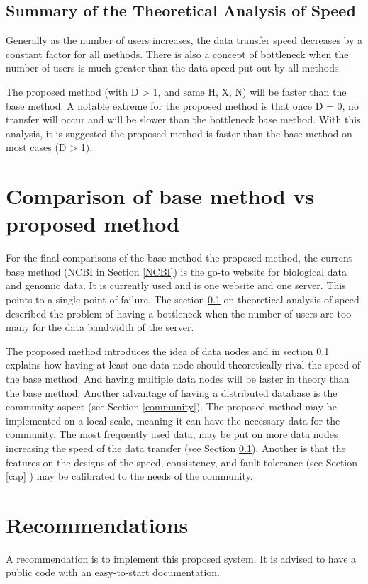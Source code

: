 \documentclass[acmsmall]{acmart}
\begin{document}
\subsection{Summary of the Theoretical Analysis of Speed} \label{theoreticalspeed}
Generally as the number of users increases, the data transfer speed decreases by a constant factor for all methods. There is also a concept of bottleneck when the number of users is much greater than the data speed put out by all methods.

The proposed method (with D > 1, and same H, X, N) will be faster than the base method. A notable extreme for the proposed method is that once D = 0, no transfer will occur and will be slower than the bottleneck base method. With this analysis, it is suggested the proposed method is faster than the base method on most cases (D > 1). 

\section{Comparison of base method vs proposed method}

For the final comparisons of the base method the proposed method, the current base method (NCBI in Section \ref{NCBI}) is the go-to website for biological data and genomic data. It is currently used and is one website and one server. This points to a single point of failure\cite{seqtorr}. The section \ref{theoreticalspeed} on theoretical analysis of speed described the problem of having a bottleneck when the number of users are too many for the data bandwidth of the server. 

The proposed method introduces the idea of data nodes and in section \ref{theoreticalspeed} explains how having at least one data node should theoretically rival the speed of the base method. And having multiple data nodes will be faster in theory than the base method. Another advantage of having a distributed database is the community aspect (see Section \ref{community}). The proposed method may be implemented on a local scale, meaning it can have the necessary data for the community. The most frequently used data, may be put on more data nodes increasing the speed of the data transfer (see Section \ref{theoreticalspeed}). Another is that the features on the designs of the speed, consistency, and fault tolerance (see Section \ref{cap} ) may be calibrated to the needs of the community. 


\section{Recommendations}
A recommendation is to implement this proposed system. It is advised to have a public code with an easy-to-start documentation.
\end{document}
